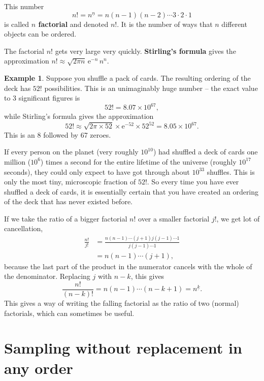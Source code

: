 \documentclass[
  a4paper,
]{book}
\theoremstyle{definition}
\theoremstyle{definition}
\newtheorem{example}{Example}[chapter]
\theoremstyle{definition}
\theoremstyle{definition}
\theoremstyle{remark}
\begin{document}
This number
\[ n! = {n}^{\underline{n}} = n(n-1)(n-2)\cdots3\cdot2\cdot1 \]
is called \textbf{\(n\) factorial} and denoted \(n!\). It is the number of ways that \(n\) different objects can be ordered.

The factorial \(n!\) gets very large very quickly. \textbf{Stirling's formula} gives the approximation
\(n! \approx \sqrt{2\pi n} \, \mathrm{e}^{-n} \, n^n\).

\begin{example}
Suppose you shuffle a pack of cards. The resulting ordering of the deck has \(52!\) possibilities. This is an unimaginably huge number -- the exact value to 3 significant figures is
\[ 52! = 8.07 \times 10^{67} , \]
while Stirling's formula gives the approximation
\[ 52! \approx \sqrt{2\pi \times 52} \times \mathrm{e}^{-52} \times 52^{52} = 8.05 \times 10^{67} . \]
This is an 8 followed by 67 zeroes.

If every person on the planet (very roughly \(10^{10}\)) had shuffled a deck of cards one million (\(10^6\)) times a second for the entire lifetime of the universe (roughly \(10^{17}\) seconds), they could only expect to have got through about \(10^{33}\) shuffles.
This is only the most tiny, microscopic fraction of \(52!\). So every time you have ever shuffled a deck of cards, it is essentially certain that you have created an ordering of the deck that has never existed before.
\end{example}

If we take the ratio of a bigger factorial \(n!\) over a smaller factorial \(j!\), we get lot of cancellation,
\begin{align*}
\frac{n!}{j!} &= \frac{n(n-1) \cdots(j+1)j(j-1) \cdots 1}{j(j-1) \cdots 1} \\
  &= n(n-1) \cdots (j+1) ,
\end{align*}
because the last part of the product in the numerator cancels with the whole of the denominator. Replacing \(j\) with \(n-k\), this gives
\[ \frac{n!}{(n-k)!} = n(n-1) \cdots (n - k + 1) = {n}^{\underline{k}} . \]
This gives a way of writing the falling factorial as the ratio of two (normal) factorials, which can sometimes be useful.

\hypertarget{combinations}{%
\section{Sampling without replacement in any order}\label{combinations}}
\end{document}
